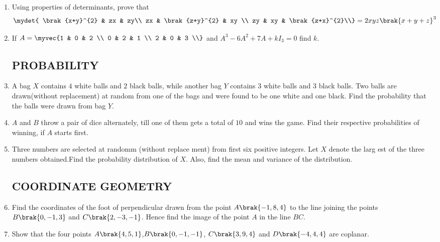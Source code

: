 \documentclass[12pt, -letter paper]{article}
\begin{document}
\begin{enumerate}
\item Using properties of determinants, prove that 
	\begin{align*}\mydet{ \brak{x+y}^{2} & zx &  zy\\ zx & \brak{z+y}^{2} & xy    \\ zy & xy & \brak{z+x}^{2}\\}=2xyz\brak{x+y+z}^{3} \end{align*}

  \item  If $A=\myvec{1 & 0 & 2 \\
	              0  & 2 & 1 \\   
		      2 & 0 & 3 \\}$ and $A^3-6A^2+7A+kI_3=0$  find $k$.

     \subsection*{PROBABILITY}		

	\item A bag $X$ contains $4$ white balls and $2$ black balls, while another bag $Y$ contains $3$ white balls and $3$ black balls. Two balls are drawn(without replacement) at random from one of the bags and were found to be one white and one black. Find the probability that the balls were drawn from bag $Y$.
	
	\item $A$ and $B$ throw a pair of dice alternately, till one of them gets a total of $10$ and wins the game. Find their respective probabilities of winning, if $A$ starts first.		
	\item Three numbers are selected at randomm (without replace    ment) from first six positive integers. Let $X$ denote the larg    est of the three numbers obtained.Find the probability distribution of $X$. Also, find the mean and variance of the distribution.


     \subsection*{COORDINATE GEOMETRY}

	\item Find the coordinates of the foot of perpendicular drawn from the point $A\brak{-1,8,4}$ to the line joining the points $B\brak{0,-1,3}$ and $C\brak{2,-3,-1}$. Hence find the image of the point $A$ in the line $BC$.



	\item Show that the four points $A\brak{4,5,1}$,$B\brak{0,-1,-1}$, $C\brak{3,9,4}$ and $D\brak{-4,4,4}$ are coplanar.


\end{enumerate}
\end{document}
